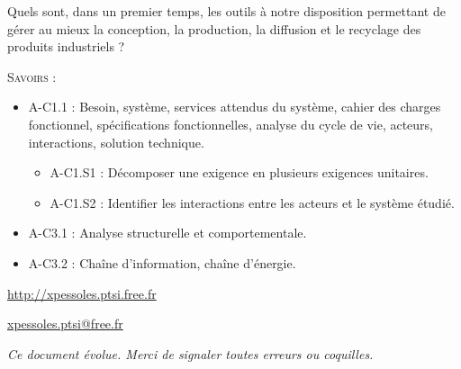 \documentclass[11pt,oneside]{article}
\begin{document}
\begin{prob}
Quels sont, dans un premier temps, les outils à notre disposition permettant de gérer au mieux la conception, la production, la diffusion et le recyclage des produits industriels ?
\end{prob}
\begin{savoir}
\textsc{Savoirs :}
\begin{itemize}
\item  A-C1.1 : Besoin, système, services attendus du système, cahier des charges fonctionnel, spécifications fonctionnelles, analyse du cycle de vie, acteurs, interactions, solution technique.
\begin{itemize}
\item A-C1.S1 : Décomposer une exigence en plusieurs exigences unitaires.
\item A-C1.S2 : Identifier les interactions entre les acteurs et le système étudié.
\end{itemize}
\item A-C3.1 : Analyse structurelle et comportementale.
\item A-C3.2 : Chaîne d'information, chaîne d'énergie.
\end{itemize}

\end{savoir}

\begin{center}
\url{http://xpessoles.ptsi.free.fr}

\url{xpessoles.ptsi@free.fr}

\end{center}

\setlength{\parskip}{0ex plus 0.2ex minus 0ex}
 \renewcommand{\contentsname}{}
 \renewcommand{\baselinestretch}{1}

\tableofcontents

 \renewcommand{\baselinestretch}{1.2}
\setlength{\parskip}{2ex plus 0.5ex minus 0.2ex}

\textit{Ce document évolue. Merci de signaler toutes erreurs ou coquilles.}
\end{document}
